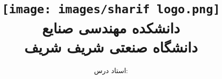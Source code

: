 \title{
	\center
	\texttt{[image: images/sharif logo.png]} \\
	دانشکده مهندسی صنایع \\[25pt]     
	دانشگاه صنعتی شریف شریف \\
	\CourseName
}

\author{
	استاد درس:
	\Instructor \\[25pt]
}
\date{\Semester}